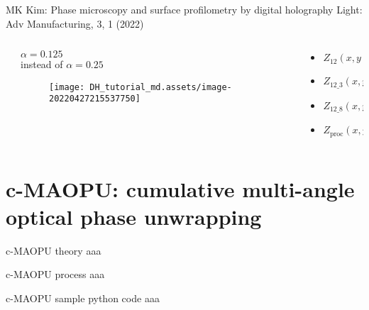 \documentclass[t, aspectratio=169]{beamer}
\begin{document}
\begin{frame}{MK Kim: Phase microscopy and surface profilometry by digital holography}
	\vspace{-3 mm}
	\small Light: Adv Manufacturing, 3, 1 (2022)
	\begin{columns}
		\begin{column}{.47\textwidth}
		\end{column}
		\begin{column}{.28\textwidth}
			$ \alpha=0.125 $ \\ instead of $ \alpha = 0.25 $
			\begin{figure}
				\texttt{[image: DH\_tutorial\_md.assets/image-20220427215537750]}
			\end{figure}
		\end{column}
		\begin{column}{.25\textwidth}
			\begin{itemize}
				\item[a) ] $ Z_{12}(x,y) $
				\item[b) ] $ Z_{12\_3}(x,y) $
				\item[c) ] $ Z_{12\_8}(x,y) $
				\item[d) ] $ Z_{\textrm{proc}}(x,y) $
			\end{itemize}
		\end{column}
	\end{columns}
\end{frame}


\section{c-MAOPU: cumulative multi-angle optical phase unwrapping}
\begin{frame}[c]
	\centering\LARGE\textbf{\secname}
\end{frame}


\begin{frame}{c-MAOPU theory}
aaa
\end{frame}


\begin{frame}{c-MAOPU process}
aaa
\end{frame}


\begin{frame}{c-MAOPU sample python code}
aaa
\end{frame}
\end{document}
